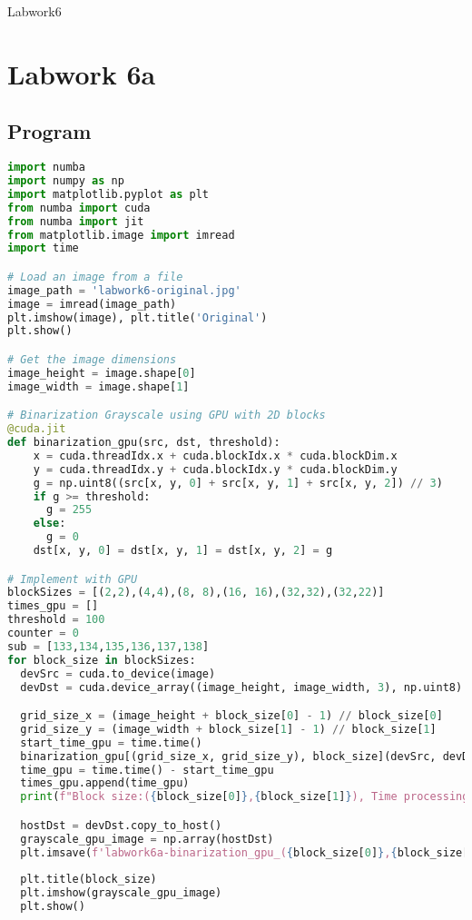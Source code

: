 \documentclass[12pt]{article}
\begin{document}
\begin{center}
    \vspace*{1.8cm}
    \Large
    Labwork6\\
\end{center}

\section{Labwork 6a}
\subsection{Program}
\begin{lstlisting}[language=Python]
import numba
import numpy as np
import matplotlib.pyplot as plt
from numba import cuda
from numba import jit
from matplotlib.image import imread
import time

# Load an image from a file
image_path = 'labwork6-original.jpg'
image = imread(image_path)
plt.imshow(image), plt.title('Original')
plt.show()

# Get the image dimensions
image_height = image.shape[0]
image_width = image.shape[1]

# Binarization Grayscale using GPU with 2D blocks
@cuda.jit
def binarization_gpu(src, dst, threshold):
    x = cuda.threadIdx.x + cuda.blockIdx.x * cuda.blockDim.x
    y = cuda.threadIdx.y + cuda.blockIdx.y * cuda.blockDim.y
    g = np.uint8((src[x, y, 0] + src[x, y, 1] + src[x, y, 2]) // 3)
    if g >= threshold:
      g = 255
    else:
      g = 0
    dst[x, y, 0] = dst[x, y, 1] = dst[x, y, 2] = g

# Implement with GPU
blockSizes = [(2,2),(4,4),(8, 8),(16, 16),(32,32),(32,22)]
times_gpu = []
threshold = 100
counter = 0 
sub = [133,134,135,136,137,138]
for block_size in blockSizes:
  devSrc = cuda.to_device(image)
  devDst = cuda.device_array((image_height, image_width, 3), np.uint8)

  grid_size_x = (image_height + block_size[0] - 1) // block_size[0]
  grid_size_y = (image_width + block_size[1] - 1) // block_size[1]
  start_time_gpu = time.time()
  binarization_gpu[(grid_size_x, grid_size_y), block_size](devSrc, devDst, threshold)
  time_gpu = time.time() - start_time_gpu
  times_gpu.append(time_gpu)
  print(f"Block size:({block_size[0]},{block_size[1]}), Time processing on GPU: {time_gpu}s")

  hostDst = devDst.copy_to_host()
  grayscale_gpu_image = np.array(hostDst)
  plt.imsave(f'labwork6a-binarization_gpu_({block_size[0]},{block_size[1]}).jpg', grayscale_gpu_image, cmap='gray')
  
  plt.title(block_size)
  plt.imshow(grayscale_gpu_image)
  plt.show()
\end{lstlisting}
\end{document}
